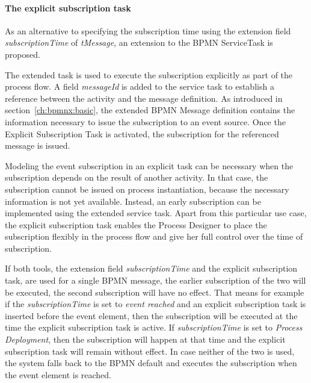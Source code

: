 \paragraph{The explicit subscription task\newline}
As an alternative to specifying the subscription time using the extension field \textit{subscriptionTime} of \textit{tMessage}, an extension to the BPMN ServiceTask is proposed. 


The extended task is used to execute the subscription explicitly as part of the process flow.
A field \textit{messageId} is added to the service task to establish a reference between the activity and the message definition.
As introduced in section~\autoref{ch:bpmnx:basic}, the extended BPMN Message definition contains the information necessary to issue the subscription to an event source.
Once the Explicit Subscription Task is activated, the subscription for the referenced message is issued. 

Modeling the event subscription in an explicit task can be necessary when the subscription depends on the result of another activity. In that case, the subscription cannot be issued on process instantiation, because the necessary information is not yet available. Instead, an early subscription can be implemented using the extended service task.
Apart from this particular use case, the explicit subscription task enables the Process Designer to place the subscription flexibly in the process flow and give her full control over the time of subscription.


If both tools, the extension field \textit{subscriptionTime} and the explicit subscription task, are used for a single BPMN message, the earlier subscription of the two will be executed, the second subscription will have no effect.
That means for example if the \textit{subscriptionTime} is set to \textit{event reached} and an explicit subscription task is inserted before the event element, then the subscription will be executed at the time the explicit subscription task is active.
If \textit{subscriptionTime} is set to \textit{Process Deployment}, then the subscription will happen at that time and the explicit subscription task will remain without effect.
In case neither of the two is used, the system falls back to the BPMN default and executes the subscription when the event element is reached.

